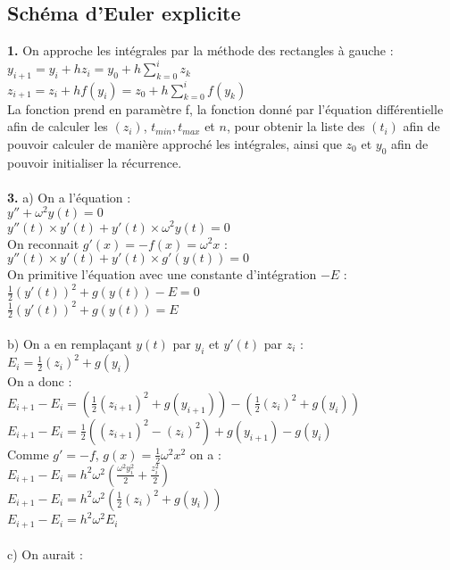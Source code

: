\documentclass{article}
\begin{document}
\subsection{Schéma d'Euler explicite}
{\bf 1.} On approche les intégrales par la méthode des rectangles à gauche : \\
$y_{ i+1}=y_i + h z_i = y_0 + h\sum_{k=0}^{i}z_k $ \\
$z_{i+1}=z_i + h f(y_i)= z_0 + h\sum_{k=0}^{i} f(y_k) $ \\

La fonction prend en paramètre f, la fonction donné par l'équation différentielle afin de calculer les $(z_i)$, $t_{min}, t_{max}$ et $n$, pour obtenir la liste des $(t_i)$ afin de pouvoir calculer de manière approché les intégrales, ainsi que $z_0$ et $y_0$ afin de pouvoir initialiser la récurrence. \\
\\
{\bf 3.} a) On a l'équation : \\
$y''+ \omega^2y(t)=0$ \\
$y''(t) \times y'(t) + y'(t) \times \omega^2 y(t)=0$ \\
On reconnait $g'(x)=-f(x)=\omega^2x $ : \\
$y''(t) \times y'(t) + y'(t) \times g'(y(t))=0$ \\
On primitive l'équation avec une constante d'intégration $-E$ : \\
$\frac{1}{2} (y'(t))^2 + g(y(t))-E=0$ \\
$\frac{1}{2} (y'(t))^2 + g(y(t))=E$ \\
 \\
b) On a en remplaçant $y(t)$ par $y_i$ et $y'(t)$ par $z_i$ : \\
$E_i=\frac{1}{2} (z_i)^2 + g(y_i)$ \\
On a donc : \\
$E_{i+1}-E_i =(\frac{1}{2} (z_{i+1})^2 + g(y_{i+1}))-(\frac{1}{2} (z_i)^2 + g(y_i))$ \\
$E_{i+1}-E_i =\frac{1}{2} ((z_{i+1})^2-(z_i)^2) + g(y_{i+1})-g(y_i)$ \\
Comme $g'=-f$, $g(x)=\frac{1}{2} \omega^2 x^2$ on a : \\
$E_{i+1}-E_i = h^2 \omega^2 (\frac{\omega^2 y_i^2}{2}+\frac{z_i^2}{2})$ \\
$E_{i+1}-E_i =h^2 \omega^2 (\frac{1}{2} (z_i)^2 + g(y_i))$ \\
$E_{i+1}-E_i =h^2 \omega^2 E_i$ \\
 \\
c) On aurait : \\
\end{document}
